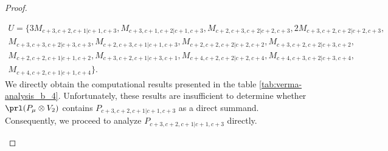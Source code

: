 \begin{proof}
\begin{enumerate}
\begin{enumerate}
\begin{equation}
  \begin{aligned}
     U = \{
3M_{c+3,c+2,c+1|c+1,c+3},
M_{c+3,c+1,c+2|c+1,c+3},
M_{c+2,c+3,c+2|c+2,c+3},
2M_{c+3,c+2,c+2|c+2,c+3},\\
M_{c+3,c+3,c+2|c+3,c+3},
M_{c+2,c+3,c+1|c+1,c+3},
M_{c+2,c+2,c+2|c+2,c+2},
M_{c+3,c+2,c+2|c+3,c+2},\\
M_{c+2,c+2,c+1|c+1,c+2},
M_{c+3,c+2,c+1|c+3,c+1},
M_{c+4,c+2,c+2|c+2,c+4},
M_{c+4,c+3,c+2|c+3,c+4},\\
M_{c+4,c+2,c+1|c+1,c+4}
\}. 
  \end{aligned}
\end{equation}
     We directly obtain the computational results presented in the table \cref{tab:verma-analysis_b_4}. Unfortunately, these results are insufficient to determine whether $\prl(P_\mu \otimes V_2)$ contains $P_{c+3,c+2,c+1|c+1,c+3}$ as a direct summand. Consequently, we proceed to analyze $P_{c+3,c+2,c+1|c+1,c+3}$ directly.


\end{enumerate}
\end{enumerate}
\end{proof}
